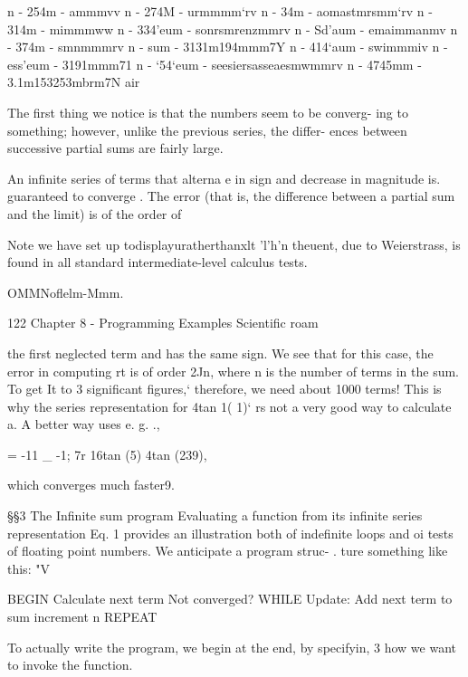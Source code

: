 n - 254m - ammmvv
n - 274M - urmmmm‘rv
n - 34m - aomastmrsmm‘rv
n - 314m - mimmmww
n - 334'eum - sonrsmrenzmmrv
n - Sd'aum - emaimmanmv
n - 374m - smnmmmrv
n - sum - 3131m194mmm7Y
n - 414‘aum - swimmmiv
n - ess'eum - 3191mmm71
n - ‘54‘eum - seesiersasseaesmwmmrv
n - 4745mm - 3.1m153253mbrm7N air

The first thing we notice is that the numbers seem to be converg-
ing to something; however, unlike the previous series, the differ-
ences between successive partial sums are fairly large.

An infinite series of terms that alterna e in sign and decrease in
magnitude is. guaranteed to converge . The error (that is, the
difference between a partial sum and the limit) is of the order of

 

Note we have set up todisplayuratherthanxlt
'l'h'n theuent, due to Weierstrass, is found in all standard intermediate-level calculus tests.

OMMNoflelm-Mmm.

122 Chapter 8 - Programming Examples Scientific roam

the first neglected term and has the same sign. We see that for
this case, the error in computing rt is of order 2Jn, where n is the
number of terms in the sum. To get It to 3 significant figures,‘
therefore, we need about 1000 terms! This is why the series
representation for 4tan 1( 1)‘ rs not a very good way to calculate a.
A better way uses e. g. .,

= -11 _ -1;
7r 16tan (5) 4tan (239),

which converges much faster9.

§§3 The Infinite sum program
Evaluating a function from its infinite series representation
Eq. 1 provides an illustration both of indefinite loops and oi
tests of floating point numbers. We anticipate a program struc- .
ture something like this: "V

 

BEGIN
Calculate next term
Not converged?
WHILE
Update:
Add next term to sum
increment n
REPEAT

To actually write the program, we begin at the end, by specifyin, 3
how we want to invoke the function.

